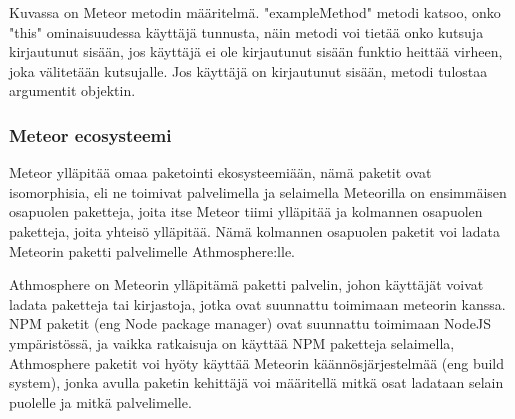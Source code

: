Kuvassa on Meteor metodin määritelmä. "exampleMethod"{} metodi katsoo, onko "this"{} ominaisuudessa käyttäjä tunnusta, 
näin metodi voi tietää onko kutsuja kirjautunut sisään,
jos käyttäjä ei ole kirjautunut sisään funktio heittää virheen, joka välitetään kutsujalle.
Jos käyttäjä on kirjautunut sisään, metodi tulostaa argumentit objektin. 
\medskip




\subsubsection{Meteor ecosysteemi}



Meteor ylläpitää omaa paketointi ekosysteemiään, 
nämä paketit ovat isomorphisia, eli ne toimivat palvelimella ja selaimella
Meteorilla on ensimmäisen osapuolen paketteja, joita itse Meteor tiimi ylläpitää ja kolmannen osapuolen paketteja,
joita yhteisö ylläpitää. Nämä kolmannen osapuolen paketit voi ladata Meteorin paketti palvelimelle Athmosphere:lle.
\medskip


Athmosphere on Meteorin ylläpitämä paketti palvelin, johon käyttäjät voivat ladata paketteja tai kirjastoja, jotka ovat suunnattu toimimaan meteorin kanssa.
NPM paketit (eng Node package manager) ovat suunnattu toimimaan NodeJS ympäristössä, ja vaikka ratkaisuja on käyttää NPM paketteja selaimella, 
Athmosphere paketit voi hyöty käyttää Meteorin käännösjärjestelmää (eng build system), jonka avulla paketin kehittäjä voi määritellä mitkä osat ladataan selain puolelle ja mitkä palvelimelle.

